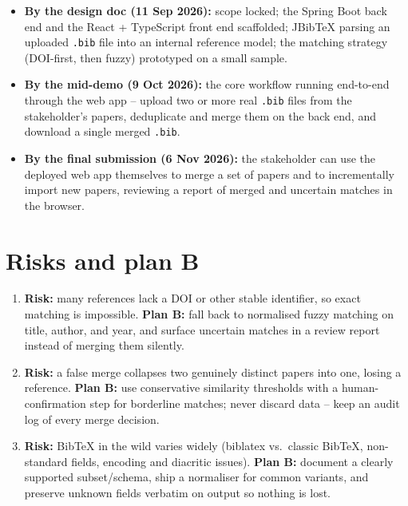 \documentclass[11pt,a4paper]{article}
\begin{document}
\begin{itemize}[nosep]
  \item \textbf{By the design doc (11 Sep 2026):}
        scope locked; the Spring Boot back end and the React + TypeScript
        front end scaffolded; JBibTeX parsing an uploaded \texttt{.bib}
        file into an internal reference model; the matching strategy
        (DOI-first, then fuzzy) prototyped on a small sample.
  \item \textbf{By the mid-demo (9 Oct 2026):}
        the core workflow running end-to-end through the web app -- upload
        two or more real \texttt{.bib} files from the stakeholder's papers,
        deduplicate and merge them on the back end, and download a single
        merged \texttt{.bib}.
  \item \textbf{By the final submission (6 Nov 2026):}
        the stakeholder can use the deployed web app themselves to merge a
        set of papers and to incrementally import new papers, reviewing a
        report of merged and uncertain matches in the browser.
\end{itemize}

\section{Risks and plan B}

\begin{enumerate}[leftmargin=*, nosep]
  \item \textbf{Risk:} many references lack a DOI or other stable
        identifier, so exact matching is impossible.
        \textbf{Plan B:} fall back to normalised fuzzy matching on
        title, author, and year, and surface uncertain matches in a review
        report instead of merging them silently.
  \item \textbf{Risk:} a false merge collapses two genuinely distinct
        papers into one, losing a reference.
        \textbf{Plan B:} use conservative similarity thresholds with a
        human-confirmation step for borderline matches; never discard data
        -- keep an audit log of every merge decision.
  \item \textbf{Risk:} BibTeX in the wild varies widely (biblatex vs.\
        classic BibTeX, non-standard fields, encoding and diacritic
        issues).
        \textbf{Plan B:} document a clearly supported subset/schema, ship a
        normaliser for common variants, and preserve unknown fields
        verbatim on output so nothing is lost.
\end{enumerate}
\end{document}
